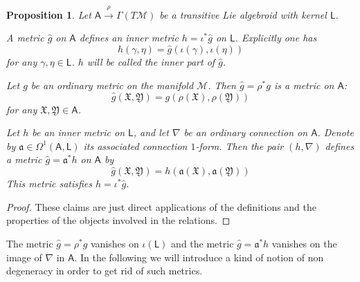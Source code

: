 \documentclass[number]{elsarticle}
\newtheorem{proposition}[theorem]{Proposition}
\theoremstyle{definition}
\theoremstyle{remark}
\numberwithin{equation}{section}
\begin{document}
\begin{proposition}
\label{prop-constructionsaroundmetrics}
Let ${{{{\mathbf{\mathsf{{A}}}}}}} \xrightarrow{\rho} \Gamma(T{{{{\mathcal{{M}}}}}})$ be a transitive Lie algebroid with kernel ${{{{\mathbf{\mathsf{{L}}}}}}}$. 

A metric ${{\widehat{g}}}$ on ${{{{\mathbf{\mathsf{{A}}}}}}}$ defines an inner metric $h = \iota^\ast {{\widehat{g}}}$ on ${{{{\mathbf{\mathsf{{L}}}}}}}$. Explicitly one has
\begin{equation*}
h( \gamma, \eta) = {{\widehat{g}}}(\iota(\gamma), \iota(\eta))
\end{equation*}
for any $\gamma, \eta \in {{{{\mathbf{\mathsf{{L}}}}}}}$. $h$ will be called the inner part of ${{\widehat{g}}}$.

Let $g$ be an ordinary metric on the manifold ${{{{\mathcal{{M}}}}}}$. Then ${{\widehat{g}}} = \rho^\ast g$ is a metric on ${{{{\mathbf{\mathsf{{A}}}}}}}$: \begin{equation*}
{{\widehat{g}}}({{\mathfrak X}}, {{\mathfrak Y}}) = g (\rho({{\mathfrak X}}), \rho({{\mathfrak Y}}))
\end{equation*}
for any ${{\mathfrak X}}, {{\mathfrak Y}} \in {{{{\mathbf{\mathsf{{A}}}}}}}$.

Let $h$ be an inner metric on ${{{{\mathbf{\mathsf{{L}}}}}}}$, and let $\nabla$ be an ordinary connection on ${{{{\mathbf{\mathsf{{A}}}}}}}$. Denote by ${\mathfrak{a}} \in \Omega^1({{{{\mathbf{\mathsf{{A}}}}}}}, {{{{\mathbf{\mathsf{{L}}}}}}})$ its associated connection $1$-form. Then the pair $(h, \nabla)$ defines a metric ${{\widehat{g}}} = {\mathfrak{a}}^\ast h$ on ${{{{\mathbf{\mathsf{{A}}}}}}}$ by
\begin{equation*}
{{\widehat{g}}}({{\mathfrak X}}, {{\mathfrak Y}}) = h ({\mathfrak{a}}({{\mathfrak X}}), {\mathfrak{a}}({{\mathfrak Y}}))
\end{equation*}
This metric satisfies $h = \iota^\ast {{\widehat{g}}}$.
\end{proposition}

\begin{proof}
These claims are just direct applications of the definitions and the properties of the objects involved in the relations.
\end{proof}

The metric ${{\widehat{g}}} = \rho^\ast g$ vanishes on $\iota({{{{\mathbf{\mathsf{{L}}}}}}})$ and the metric ${{\widehat{g}}} = {\mathfrak{a}}^\ast h$ vanishes on the image of $\nabla$ in ${{{{\mathbf{\mathsf{{A}}}}}}}$. In the following we will introduce a kind of notion of non degeneracy in order to get rid of such metrics.
\end{document}
